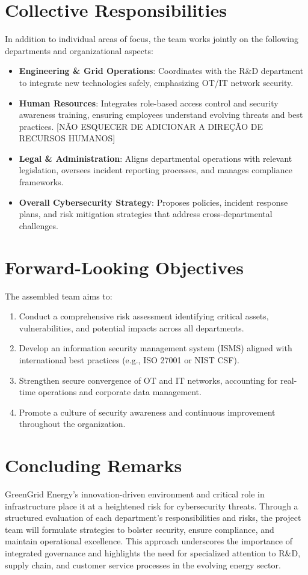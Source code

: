 \section{Collective Responsibilities}
In addition to individual areas of focus, the team works jointly on the following departments and organizational aspects:
\begin{itemize}
    \item \textbf{Engineering \& Grid Operations}: Coordinates with the R\&D department to integrate new technologies safely, emphasizing OT/IT network security.
    \item \textbf{Human Resources}: Integrates role-based access control and security awareness training, ensuring employees understand evolving threats and best practices. [NÃO ESQUECER DE ADICIONAR A DIREÇÃO DE RECURSOS HUMANOS]
    \item \textbf{Legal \& Administration}: Aligns departmental operations with relevant legislation, oversees incident reporting processes, and manages compliance frameworks.
    \item \textbf{Overall Cybersecurity Strategy}: Proposes policies, incident response plans, and risk mitigation strategies that address cross-departmental challenges.
\end{itemize}

\section{Forward-Looking Objectives}
The assembled team aims to:
\begin{enumerate}
    \item Conduct a comprehensive risk assessment identifying critical assets, vulnerabilities, and potential impacts across all departments.
    \item Develop an information security management system (ISMS) aligned with international best practices (e.g., ISO 27001 or NIST CSF).
    \item Strengthen secure convergence of OT and IT networks, accounting for real-time operations and corporate data management.
    \item Promote a culture of security awareness and continuous improvement throughout the organization.
\end{enumerate}

\section{Concluding Remarks}
GreenGrid Energy’s innovation-driven environment and critical role in infrastructure place it at a heightened risk for cybersecurity threats. Through a structured evaluation of each department’s responsibilities and risks, the project team will formulate strategies to bolster security, ensure compliance, and maintain operational excellence. This approach underscores the importance of integrated governance and highlights the need for specialized attention to R\&D, supply chain, and customer service processes in the evolving energy sector.
